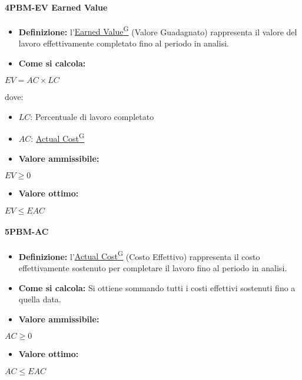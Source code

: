 \paragraph*{4PBM-EV Earned Value}
\begin{itemize}
    \item \textbf{Definizione:} l’\href{https://code7crusaders.github.io/docs/RTB/documentazione_interna/glossario.html#earned-value}{Earned Value\textsuperscript{G}} (Valore Guadagnato) rappresenta il valore del lavoro effettivamente completato fino al periodo in analisi.
    \item \textbf{Come si calcola:}
\end{itemize}
\begin{center}
   $EV = AC \times LC$ 
\end{center}
dove:
\begin{itemize}[label=$\rightarrow$]
    \item $LC$: Percentuale di lavoro completato
    \item $AC$: \href{https://code7crusaders.github.io/docs/RTB/documentazione_interna/glossario.html#actual-cost}{Actual Cost\textsuperscript{G}}
\end{itemize}
\begin{itemize}
    \item \textbf{Valore ammissibile:}
\end{itemize}
\begin{center}
    $EV \geq 0$
\end{center}
\begin{itemize}
    \item \textbf{Valore ottimo:}
\end{itemize}
\begin{center}
    $EV \leq EAC$
\end{center}

\paragraph*{5PBM-AC}
\begin{itemize}
    \item \textbf{Definizione:} l’\href{https://code7crusaders.github.io/docs/RTB/documentazione_interna/glossario.html#actual-cost}{Actual Cost\textsuperscript{G}} (Costo Effettivo) rappresenta il costo effettivamente sostenuto per completare il lavoro fino al periodo in analisi.
    \item \textbf{Come si calcola:} Si ottiene sommando tutti i costi effettivi sostenuti fino a quella data.
\end{itemize}
\begin{itemize}
    \item \textbf{Valore ammissibile:}
\end{itemize}
\begin{center}
    $AC \geq 0$
\end{center}
\begin{itemize}
    \item \textbf{Valore ottimo:}
\end{itemize}
\begin{center}
    $AC \leq EAC$
\end{center}

